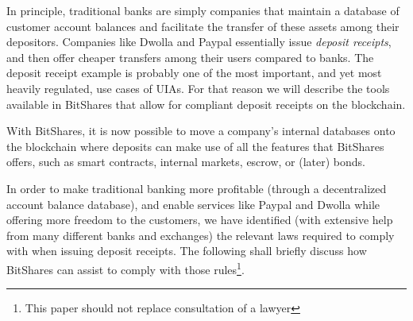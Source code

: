 \label{sec:uia:restrictions}

In principle, traditional banks are simply companies that maintain a database
of customer account balances and facilitate the transfer of these assets among
their depositors. Companies like Dwolla and Paypal essentially issue
\emph{deposit receipts}, and then offer cheaper transfers among their users
compared to banks. The deposit receipt example is probably one of the most
important, and yet most heavily regulated, use cases of UIAs. For that reason
we will describe the tools available in BitShares that allow for compliant
deposit receipts on the blockchain.

With BitShares, it is now possible to move a company's internal databases onto
the blockchain where deposits can make use of all the features that BitShares
offers, such as smart contracts, internal markets, escrow, or (later) bonds.

In order to make traditional banking more profitable (through a decentralized
account balance database), and enable services like Paypal and Dwolla while
offering more freedom to the customers, we have identified (with extensive help
from many different banks and exchanges) the relevant laws required to comply
with when issuing deposit receipts. The following shall briefly discuss how
BitShares can assist to comply with those rules\footnote{This paper should not
replace consultation of a lawyer}.

